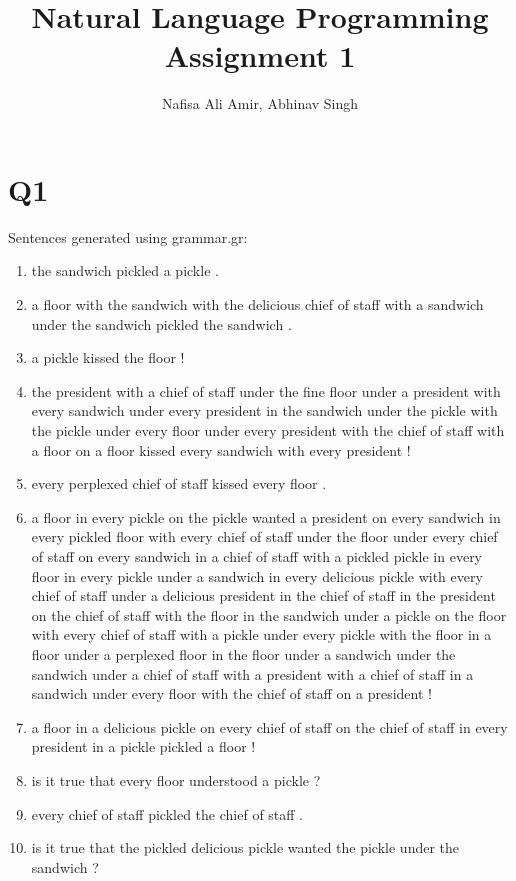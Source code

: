 \documentclass[12pt]{article}
\author{Nafisa Ali Amir, Abhinav Singh}
\title{Natural Language Programming  \\
	Assignment 1}
\begin{document}
\maketitle
\section*{Q1}
Sentences generated using grammar.gr:
\begin{enumerate}
\item {
	the sandwich pickled a pickle . 
	}

\item {
	a floor with the sandwich with the delicious chief of staff with a sandwich under the sandwich pickled the sandwich . 
	}

\item {
	a pickle kissed the floor ! 
	}

\item {
	the president with a chief of staff under the fine floor under a president with every sandwich under every president in the sandwich under the pickle with the pickle under every floor under every president with the chief of staff with a floor on a floor kissed every sandwich with every president ! 
	}

\item {
	every perplexed chief of staff kissed every floor . 
	}

\item {
	a floor in every pickle on the pickle wanted a president on every sandwich in every pickled floor with every chief of staff under the floor under every chief of staff on every sandwich in a chief of staff with a pickled pickle in every floor in every pickle under a sandwich in every delicious pickle with every chief of staff under a delicious president in the chief of staff in the president on the chief of staff with the floor in the sandwich under a pickle on the floor with every chief of staff with a pickle under every pickle with the floor in a floor under a perplexed floor in the floor under a sandwich under the sandwich under a chief of staff with a president with a chief of staff in a sandwich under every floor with the chief of staff on a president ! 
	}

\item {
	a floor in a delicious pickle on every chief of staff on the chief of staff in every president in a pickle pickled a floor ! 
	}

\item {
	is it true that every floor understood a pickle ? 
	}

\item {
	every chief of staff pickled the chief of staff . 
	}

\item {
	is it true that the pickled delicious pickle wanted the pickle under the sandwich ?
	}
\end{enumerate}
\pagebreak
\end{document}
